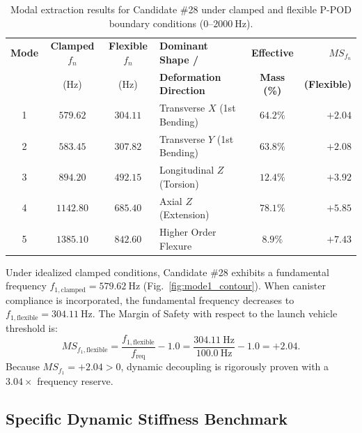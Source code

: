 \begin{table}[htbp]
\centering
\caption{Modal extraction results for Candidate \#28 under clamped and flexible P-POD boundary conditions ($0\text{--}\SI{2000}{\hertz}$).}
\label{tab:modal_results}
\scriptsize
\setlength{\tabcolsep}{3.5pt}
\begin{tabularx}{\textwidth}{c c c l c r}
\toprule
\textbf{Mode} & \textbf{Clamped $f_n$} & \textbf{Flexible $f_n$} & \textbf{Dominant Shape /} & \textbf{Effective} & \textbf{$MS_{f_n}$} \\
& (\si{\hertz}) & (\si{\hertz}) & \textbf{Deformation Direction} & \textbf{Mass (\%)} & \textbf{(Flexible)} \\
\midrule
1 & $\mathbf{579.62}$ & $\mathbf{304.11}$ & Transverse $X$ (1st Bending) & $64.2\%$ & $\mathbf{+2.04}$ \\
2 & $583.45$ & $307.82$ & Transverse $Y$ (1st Bending) & $63.8\%$ & $+2.08$ \\
3 & $894.20$ & $492.15$ & Longitudinal $Z$ (Torsion) & $12.4\%$ & $+3.92$ \\
4 & $1142.80$ & $685.40$ & Axial $Z$ (Extension) & $78.1\%$ & $+5.85$ \\
5 & $1385.10$ & $842.60$ & Higher Order Flexure & $8.9\%$ & $+7.43$ \\
\bottomrule
\end{tabularx}
\end{table}

Under idealized clamped conditions, Candidate \#28 exhibits a fundamental frequency $f_{1,\text{clamped}} = \SI{579.62}{\hertz}$ (Fig.~\ref{fig:mode1_contour}). When canister compliance is incorporated, the fundamental frequency decreases to $f_{1,\text{flexible}} = \SI{304.11}{\hertz}$. The Margin of Safety with respect to the launch vehicle threshold is:
\begin{equation}
MS_{f_1,\text{flexible}} = \frac{f_{1,\text{flexible}}}{f_{\text{req}}} - 1.0 = \frac{\SI{304.11}{\hertz}}{\SI{100.0}{\hertz}} - 1.0 = \mathbf{+2.04}.
\label{eq:ms_modal}
\end{equation}
Because $MS_{f_1} = +2.04 > 0$, dynamic decoupling is rigorously proven with a $3.04\times$ frequency reserve.

\subsection{Specific Dynamic Stiffness Benchmark}

